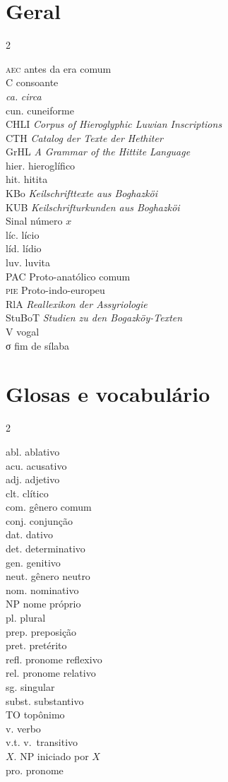 \newcommand{\abreviacao}[2]{\noindent #1 \hspace{10pt}\hfill #2\\}
\newenvironment{abreviacoes}{
	\flushright%
	\setlength{\columnsep}{50pt}
	\small
	\begin{multicols}{2}
		}{
	\end{multicols}
}

\section*{Geral}
\begin{abreviacoes}
	\abreviacao{\textsc{aec}}{antes da era comum}
	\abreviacao{C}{consoante}
	\abreviacao{\emph{ca.}}{\emph{circa}}
	\abreviacao{cun.}{cuneiforme}
	\abreviacao{CHLI}{\emph{\foreignlanguage{english}{Corpus of Hieroglyphic Luwian Inscriptions}}}
	\abreviacao{CTH}{\emph{\foreignlanguage{german}{Catalog der Texte der Hethiter}}}
	\abreviacao{GrHL}{\emph{\foreignlanguage{english}{A Grammar of the Hittite Language}}}
	\abreviacao{hier.}{hieroglífico}
	\abreviacao{hit.}{hitita}
	\abreviacao{KBo}{\emph{\foreignlanguage{german}{Keilschrifttexte aus Boghazköi}}}
	\abreviacao{KUB}{\emph{\foreignlanguage{german}{Keilschrifturkunden aus Boghazköi}}}
	\abreviacao{}{Sinal número $x$}
	\abreviacao{líc.}{lício}
	\abreviacao{líd.}{lídio}
	\abreviacao{luv.}{luvita}
	\abreviacao{\textsc{PAC}}{Proto-anatólico comum}
	\abreviacao{\textsc{pie}}{Proto-indo-europeu}
	\abreviacao{RlA}{\emph{\foreignlanguage{german}{Reallexikon der Assyriologie}}}
	\abreviacao{StuBoT}{\emph{\foreignlanguage{german}{Studien zu den
				Bogazköy-Texten}}}
	\abreviacao{V}{vogal}
	\abreviacao{σ}{fim de sílaba}
\end{abreviacoes}


\section*{Glosas e vocabulário}
\begin{abreviacoes}
	\abreviacao{abl.}{ablativo}
	\abreviacao{acu.}{acusativo}
	\abreviacao{adj.}{adjetivo}
	\abreviacao{clt.}{clítico}
	\abreviacao{com.}{gênero comum}
	\abreviacao{conj.}{conjunção}
	\abreviacao{dat.}{dativo}
	\abreviacao{det.}{determinativo}
	\abreviacao{gen.}{genitivo}
	\abreviacao{neut.}{gênero neutro}
	\abreviacao{nom.}{nominativo}
	\abreviacao{NP}{nome próprio}
	\abreviacao{pl.}{plural}
	\abreviacao{prep.}{preposição}
	\abreviacao{pret.}{pretérito}
	\abreviacao{refl.}{pronome reflexivo}
	\abreviacao{rel.}{pronome relativo}
	\abreviacao{sg.}{singular}
	\abreviacao{subst.}{substantivo}
	\abreviacao{TO}{topônimo}
	\abreviacao{v.}{verbo}
	\abreviacao{v.t.}{v.\ transitivo}
	\abreviacao{$X$.}{NP iniciado por $X$}
	\abreviacao{pro.}{pronome}
\end{abreviacoes}

